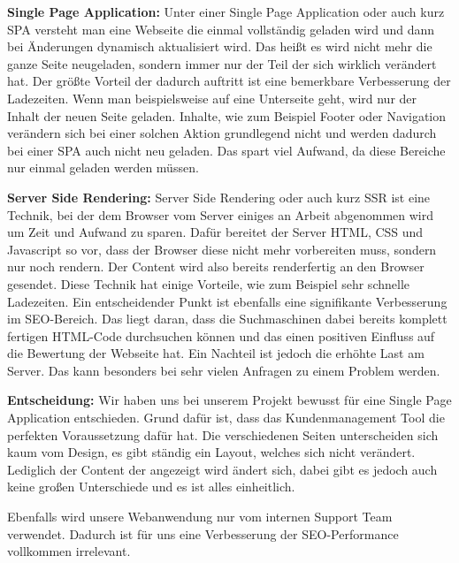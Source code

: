 \textbf{Single Page Application:}
\newline
Unter einer Single Page Application oder auch kurz SPA versteht man eine Webseite die einmal vollständig geladen wird und dann bei Änderungen dynamisch aktualisiert wird. Das heißt es wird nicht mehr die ganze Seite neugeladen, sondern immer nur der Teil der sich wirklich verändert hat. Der größte Vorteil der dadurch auftritt ist eine bemerkbare Verbesserung der Ladezeiten. Wenn man beispielsweise auf eine Unterseite geht, wird nur der Inhalt der neuen Seite geladen. Inhalte, wie zum Beispiel Footer oder Navigation verändern sich bei einer solchen Aktion grundlegend nicht und werden dadurch bei einer SPA auch nicht neu geladen. Das spart viel Aufwand, da diese Bereiche nur einmal geladen werden müssen.

\cite{frontend_spa}

\textbf{Server Side Rendering:}
Server Side Rendering oder auch kurz SSR ist eine Technik, bei der dem Browser vom Server einiges an Arbeit abgenommen wird um Zeit und Aufwand zu sparen. Dafür bereitet der Server HTML, CSS und Javascript so vor, dass der Browser diese nicht mehr vorbereiten muss, sondern nur noch rendern. Der Content wird also bereits renderfertig an den Browser gesendet.
Diese Technik hat einige Vorteile, wie zum Beispiel sehr schnelle Ladezeiten. Ein entscheidender Punkt ist ebenfalls eine signifikante Verbesserung im SEO-Bereich. Das liegt daran, dass die Suchmaschinen dabei bereits komplett fertigen HTML-Code durchsuchen können und das einen positiven Einfluss auf die Bewertung der Webseite hat. 
Ein Nachteil ist jedoch die erhöhte Last am Server. Das kann besonders bei sehr vielen Anfragen zu einem Problem werden.

\cite{frontend_ssr}

\textbf{Entscheidung:}
\newline
Wir haben uns bei unserem Projekt bewusst für eine Single Page Application entschieden. Grund dafür ist, dass das Kundenmanagement Tool die perfekten Voraussetzung dafür hat. Die verschiedenen Seiten unterscheiden sich kaum vom Design, es gibt ständig ein Layout, welches sich nicht verändert. Lediglich der Content der angezeigt wird ändert sich, dabei gibt es jedoch auch keine großen Unterschiede und es ist alles einheitlich.

Ebenfalls wird unsere Webanwendung nur vom internen Support Team verwendet. Dadurch ist für uns eine Verbesserung der SEO-Performance vollkommen irrelevant.